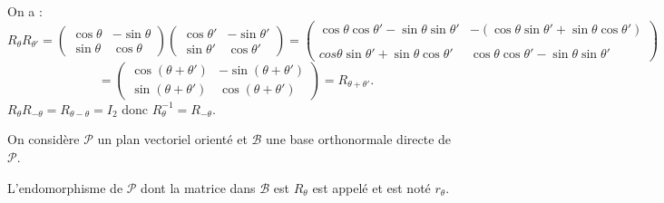 \documentclass{book}
\begin{document}
\begin{Demonstration}
On a : $$R_\theta R_{\theta'}=\begin{pmatrix} \cos \theta &-\sin \theta \\ \sin \theta & \cos \theta \end{pmatrix} \begin{pmatrix} \cos \theta' &-\sin \theta' \\ \sin \theta' & \cos \theta' \end{pmatrix}=\begin{pmatrix} \cos \theta \cos \theta'- \sin \theta \sin \theta'  &- (\cos\theta \sin \theta'+\sin\theta \cos \theta') \\ \\cos\theta \sin \theta'+\sin\theta \cos \theta' &\cos \theta \cos \theta'- \sin \theta \sin \theta'\end{pmatrix}$$
$$=\begin{pmatrix} \cos(\theta+\theta') &-\sin(\theta+\theta') \\ \sin(\theta+\theta') & \cos(\theta+\theta') \end{pmatrix}=R_{\theta+\theta'}.$$
$R_\theta R_{-\theta}=R_{\theta-\theta}=I_2$ donc $R_\theta^{-1}= R_{-\theta}$.
\end{Demonstration}
On considère $\mathcal{P}$ un plan vectoriel orienté et $\mathcal{B}$ une base orthonormale directe de $\mathcal{P}$.
\begin{Definition}[Rotation]
L'endomorphisme de $\mathcal{P}$ dont la matrice dans $\mathcal{B}$ est $R_{\theta}$ est appelé  et est noté $r_{\theta}$.
\end{Definition}
\end{document}
